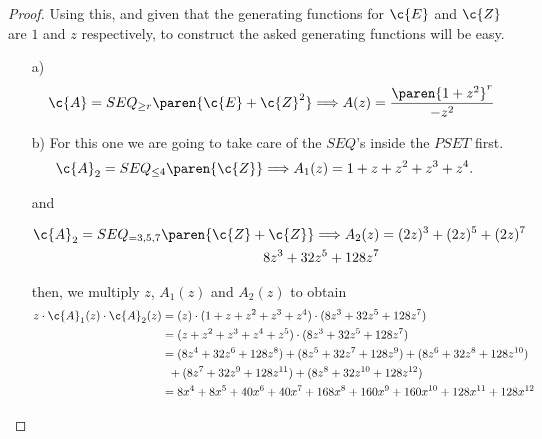 \begin{proof}
    Using this, and given that the generating functions for $\c{E}$ and $\c{Z}$ are $1$ and $z$ respectively, to construct the asked 
    generating functions will be easy.
    
    \begin{itemize}
        \item[a)]
            \begin{align}
                    \c{A} = 
                    SEQ_{\geq r}\paren{ \c{E} + \c{Z}^2 } 
                    \Longrightarrow   
                    A(z) = \frac{\paren{1 + z^2}^r}{-z^2}
            \end{align}
        \item[b)]
            For this one we are going to take care of the $SEQ$'s inside the $PSET$ first.
            \begin{align}
                \c{A}_2 = SEQ_{\leq 4} \paren{\c{Z}} \Longrightarrow A_1(z) &= 1 + z + z^2 + z^3 + z^4.
            \end{align}
            
            and
            
            \begin{align}
                \c{A}_2 = SEQ_{=3,5,7}\paren{ \c{Z} + \c{Z} } \Longrightarrow A_2(z)    &=  (2z)^3 + (2z)^5 + (2z)^7 \\
                                                                                    8z^3 + 32z^5 + 128z^7
            \end{align}
            
            then, we multiply $z$, $A_1(z)$ and $A_2(z)$ to obtain 
            \begin{align}
                z \cdot \c{A}_1(z) \cdot \c{A}_2(z) &= (z) \cdot (1 + z + z^2 + z^3 + z^4) \cdot (8z^3 + 32z^5 + 128z^7)                    \\
                                                    &= (z + z^2 + z^3 + z^4 + z^5) \cdot (8z^3 + 32z^5 + 128z^7)                            \\
                                                    &= (8z^4 + 32z^6 + 128z^8) + (8z^5 + 32z^7 + 128z^9) + (8z^6 + 32z^8 + 128z^{10})       \\
                                                    &\;\;    + (8z^7 + 32z^9 + 128z^{11}) + (8z^8 + 32z^{10} + 128z^{12})                   \\ 
                                                    &=  8x^4 + 8x^5 + 40x^6 + 40x^7 + 168x^8 + 160x^9 + 160x^{10} + 128x^{11} + 128x^{12}   \\
            \end{align}


\end{itemize}
\end{proof}
